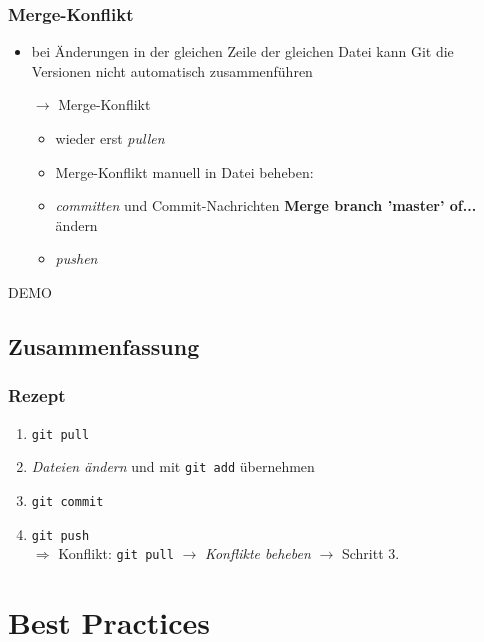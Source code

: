 \documentclass[accentcolor=tud8b,colorbacktitle,inverttitle,landscape,german,presentation,t]{tudbeamer}
\begin{document}
			\begin{frame}
				\frametitle{Merge-Konflikt}
					\begin{itemize}
						\item bei Änderungen in der gleichen Zeile der gleichen Datei kann Git die Versionen nicht automatisch zusammenführen
						\item[$\rightarrow$] Merge-Konflikt
						\begin{itemize}
							\item wieder erst \textit{pullen}
							\item Merge-Konflikt manuell in Datei beheben:\\
							
							\item \textit{committen} und Commit-Nachrichten \textbf{Merge branch 'master' of...} ändern
							\item \textit{pushen}
						\end{itemize}
					\end{itemize}
				
			\end{frame}
			
			\begin{frame}
				DEMO
			\end{frame}
		
	\subsection{Zusammenfassung}
		\begin{frame}
		\frametitle{Rezept}
			\begin{enumerate}
				\item \texttt{git pull}
				\item \textit{Dateien ändern} und mit \texttt{git add} übernehmen
				\item \texttt{git commit}
				\item \texttt{git push}\\
				$\Rightarrow$ Konflikt: \texttt{git pull} $\rightarrow$ \textit{Konflikte beheben} $\rightarrow$ Schritt 3.
				
			\end{enumerate}
		\end{frame}
		
	\section{Best Practices}
\end{document}
